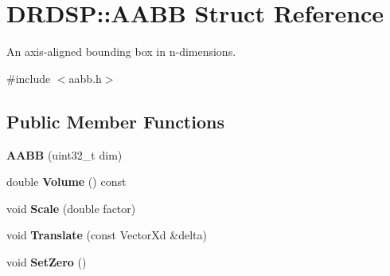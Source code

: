 \hypertarget{struct_d_r_d_s_p_1_1_a_a_b_b}{\section{D\-R\-D\-S\-P\-:\-:A\-A\-B\-B Struct Reference}
\label{struct_d_r_d_s_p_1_1_a_a_b_b}
}


An axis-\/aligned bounding box in n-\/dimensions.  




{\ttfamily \#include $<$aabb.\-h$>$}

\subsection*{Public Member Functions}
\begin{DoxyCompactItemize}
\item 
\hypertarget{struct_d_r_d_s_p_1_1_a_a_b_b_a1c7e675e120109fe01b9e25163ee1582}{{\bfseries A\-A\-B\-B} (uint32\-\_\-t dim)}\label{struct_d_r_d_s_p_1_1_a_a_b_b_a1c7e675e120109fe01b9e25163ee1582}

\item 
\hypertarget{struct_d_r_d_s_p_1_1_a_a_b_b_afde78b10d7572acdd515b711a11854d2}{double {\bfseries Volume} () const }\label{struct_d_r_d_s_p_1_1_a_a_b_b_afde78b10d7572acdd515b711a11854d2}

\item 
\hypertarget{struct_d_r_d_s_p_1_1_a_a_b_b_aed54140a2475ce0bb49cff8b4672a27e}{void {\bfseries Scale} (double factor)}\label{struct_d_r_d_s_p_1_1_a_a_b_b_aed54140a2475ce0bb49cff8b4672a27e}

\item 
\hypertarget{struct_d_r_d_s_p_1_1_a_a_b_b_a59540823643c20e61f49dac04a167649}{void {\bfseries Translate} (const Vector\-Xd \&delta)}\label{struct_d_r_d_s_p_1_1_a_a_b_b_a59540823643c20e61f49dac04a167649}

\item 
\hypertarget{struct_d_r_d_s_p_1_1_a_a_b_b_abee9488dff679ac9956fc01dbbe5b4ef}{void {\bfseries Set\-Zero} ()}\label{struct_d_r_d_s_p_1_1_a_a_b_b_abee9488dff679ac9956fc01dbbe5b4ef}

\end{DoxyCompactItemize}
